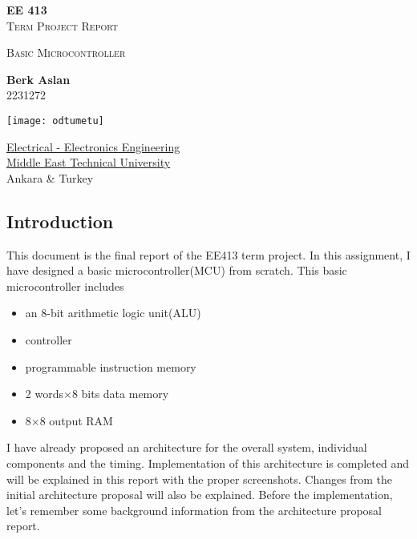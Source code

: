 \documentclass[12pt]{article}
\begin{document}
\begin{titlepage}
\begin{center}


\vspace*{3cm}
\begin{LARGE}
\textbf{EE 413}\\
\vspace{1cm}
\textsc{Term Project Report}\\
\vspace{1cm}

\begin{Large}
\textsc{Basic Microcontroller}
\end{Large}
\end{LARGE}
       
\vspace{3cm}

\begin{large}
{\bf Berk Aslan}  \\
2231272 
\end{large}

\vspace{2.5cm}


\texttt{[image: odtumetu]}
            
\href{https://eee.metu.edu.tr/}{Electrical - Electronics Engineering}\\
\href{https://metu.edu.tr/}{Middle East Technical University}\\
{Ankara \& Turkey}\\

       
\pagestyle{empty}  
\end{center}
\end{titlepage}


\subsection*{Introduction}

This document is the final report of the EE413 term project. In this assignment, I have designed a basic microcontroller(MCU) from scratch. This basic microcontroller includes 
\begin{itemize}
\item an 8-bit arithmetic logic unit(ALU)
\item controller
\item programmable instruction memory
\item 2 words$\times$8 bits data memory
\item 8$\times$8 output RAM
\end{itemize}
I have already proposed an architecture for the overall system, individual components and the timing. Implementation of this architecture is completed and will be explained in this report with the proper screenshots. Changes from the initial architecture proposal will also be explained. Before the implementation, let's remember some background information from the architecture proposal report.
\end{document}
